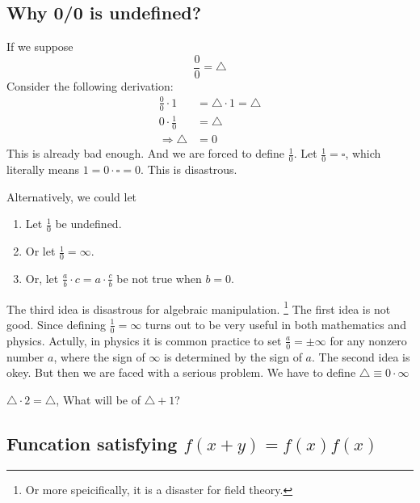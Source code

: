 \subsection{Why 0/0 is undefined?}
If we suppose
$$ \frac{0}{0}= \triangle $$
Consider the following derivation:
\begin{align}
\frac{0}{0} \cdot 1 &= \triangle \cdot 1 = \triangle \\
0 \cdot \frac{1}{0} &= \triangle\\
\Rightarrow \triangle &= 0
\end{align}
This is already bad enough. And we are forced to define $\frac{1}{0}$.
Let $\frac{1}{0} = \square$, which literally means $1=0\cdot \square = 0$.
This is disastrous.

Alternatively, we could let
\begin{enumerate}
   	\item Let $\frac{1}{0}$ be undefined.
   	\item Or let $\frac{1}{0} =
   	\infty$.
   	\item Or, let $\frac{a}{b}\cdot c= a\cdot \frac{c}{b}$ be not 
   	true when $b=0$.
\end{enumerate}
The third idea is disastrous for algebraic manipulation. \footnote{
   	Or more speicifically, it is a disaster for field theory.
}
The first idea is not good. Since defining $\frac{1}{0}=\infty$ turns
out to be very useful in both mathematics and physics. Actully, in
physics it is common practice to set $\frac{a}{0}=\pm\infty$ for
any nonzero number $a$, where the sign of $\infty$ is determined by 
the sign of $a$.
The second idea is okey. But then we are faced with a serious problem.
We have to define $\triangle \equiv 0 \cdot \infty$

$\triangle \cdot 2 = \triangle$, What will be of $\triangle + 1$?
\subsection{Funcation satisfying \texorpdfstring{$f(x+y)=f(x)f(x)$}{}}
\label{sec:Funcation satisfying \texorpdfstring{$f(x+y)=f(x)f(x)$}{}}

